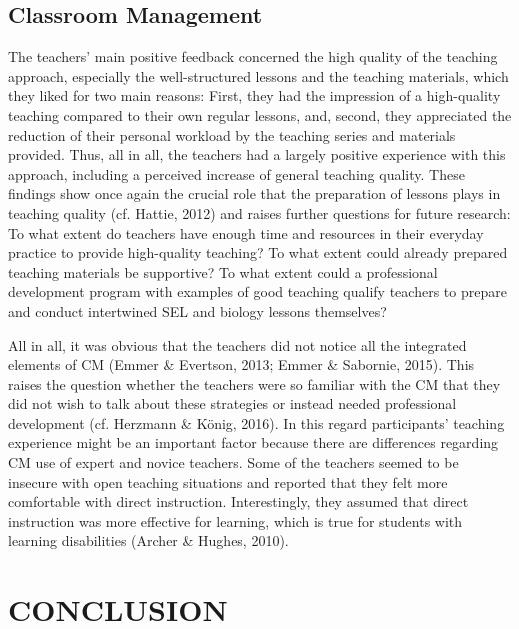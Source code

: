 \documentclass[11.5pt]{sig-alternate} %
\begin{document}
\begin{large}
\subsection*{Classroom Management}

The teachers’ main positive feedback concerned the high quality of the teaching approach, especially the well-structured lessons and the teaching materials, which they liked for two main reasons: First, they had the impression of a high-quality teaching compared to their own regular lessons, and, second, they appreciated the reduction of their personal workload by the teaching series and materials provided. Thus, all in all, the teachers had a largely positive experience with this approach, including a perceived increase of general teaching quality. These findings show once again the crucial role that the preparation of lessons plays in teaching quality (cf. Hattie, 2012) and raises further questions for future research: To what extent do teachers have enough time and resources in their everyday practice to provide high-quality teaching? To what extent could already prepared teaching materials be supportive? To what extent could a professional development program with examples of good teaching qualify teachers to prepare and conduct intertwined SEL and biology lessons themselves? 

All in all, it was obvious that the teachers did not notice all the integrated elements of CM (Emmer \& Evertson, 2013; Emmer \& Sabornie, 2015). This raises the question whether the teachers were so familiar with the CM that they did not wish to talk about these strategies or instead needed professional development (cf. Herzmann \& König, 2016). In this regard participants’ teaching experience might be an important factor because there are differences regarding CM use of expert and novice teachers. Some of the teachers seemed to be insecure with open teaching situations and reported that they felt more comfortable with direct instruction. Interestingly, they assumed that direct instruction was more effective for learning, which is true for students with learning disabilities (Archer \& Hughes, 2010).

\section*{CONCLUSION}


\end{large}
\end{document}
